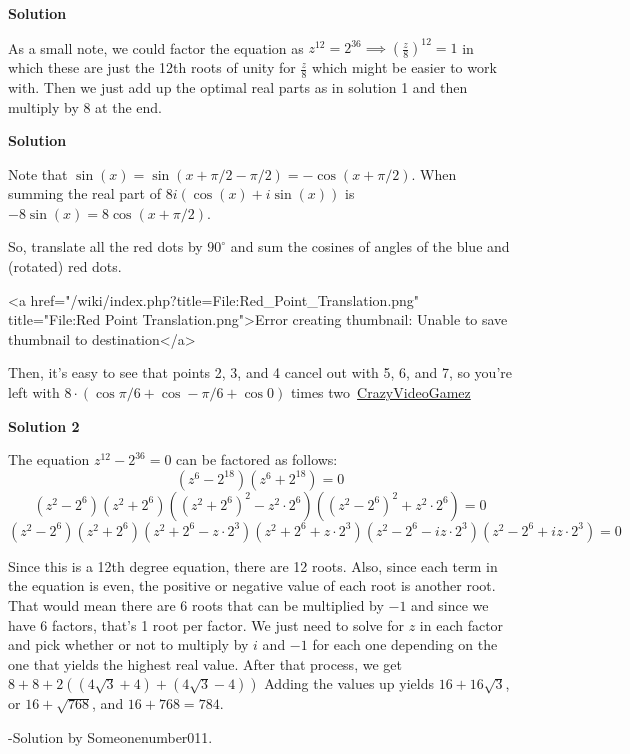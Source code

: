 \begin{enumerate}
\textbf{Solution }

As a small note, we could factor the equation as $z^{12} = 2^{36} \implies (\frac{z}{8})^{12} = 1$ in which these are just the 12th roots of unity for $\frac{z}{8}$ which might be easier to work with. Then we just add up the optimal real parts as in solution 1 and then multiply by 8 at the end.

 



\textbf{Solution }

Note that $\sin(x) = \sin(x + \pi/2 - \pi/2) = -\cos(x + \pi/2)$. When summing the real part of $8i(\cos(x) + i\sin(x))$ is $-8\sin(x) = 8\cos(x + \pi/2)$.

 So, translate all the red dots by $90^{\circ}$ and sum the cosines of angles of the blue and (rotated) red dots.

 <a href="/wiki/index.php?title=File:Red\_Point\_Translation.png" title="File:Red Point Translation.png">Error creating thumbnail: Unable to save thumbnail to destination</a>

 Then, it's easy to see that points 2, 3, and 4 cancel out with 5, 6, and 7, so you're left with $8 \cdot (\cos \pi/6 + \cos -\pi/6 + \cos 0)$ times two~\href{https://artofproblemsolving.com/wiki/index.php?title=User:Crazyvideogamez}{CrazyVideoGamez}

 



\textbf{Solution 2}

The equation $z^{12}-2^{36}=0$ can be factored as follows:
 \[(z^6-2^{18})(z^6+2^{18})=0\]
 \[(z^2-2^6)(z^2+2^6)({(z^2+2^6)}^2-z^2\cdot2^6)({(z^2-2^6)}^2+z^2\cdot2^6)=0\]
 \[(z^2-2^6)(z^2+2^6)(z^2+2^6-z\cdot2^3)(z^2+2^6+z\cdot2^3) (z^2-2^6-iz\cdot2^3)(z^2-2^6+i z\cdot2^3)=0\]

 Since this is a 12th degree equation, there are 12 roots. Also, since each term in the equation is even, the positive or negative value of each root is another root. That would mean there are 6 roots that can be multiplied by $-1$ and since we have 6 factors, that’s 1 root per factor. We just need to solve for $z$ in each factor and pick whether or not to multiply by $i$ and $-1$ for each one depending on the one that yields the highest real value. After that process, we get $8+8+2((4\sqrt{3}+4)+(4\sqrt{3}-4))$ Adding the values up yields $16+16\sqrt{3}$, or $16+\sqrt{768}$, and $16+768=\boxed{784}$.

 -Solution by Someonenumber011.

 




\end{enumerate}
